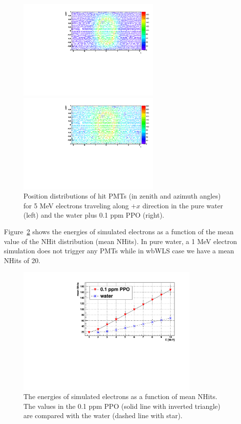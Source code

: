 \begin{figure}[htbp]
	\centering
	\begin{minipage}[t]{0.48\textwidth}
		\centering
		\includegraphics[width=7cm]{PMT_5MeVElectronWater.pdf}
	\end{minipage}
	\begin{minipage}[t]{0.48\textwidth}
		\centering
		\includegraphics[width=7cm]{PMT_5MeVElectron0p1ppmPPO.pdf}
	\end{minipage}
	\caption[Position distributions of hit PMTs (in zenith and azimuth angles).]{Position distributions of hit PMTs (in zenith and azimuth angles) for 5 MeV electrons traveling along $+x$ direction in the pure water (left) and the water plus 0.1 ppm PPO (right).}
	\label{pmt_wls}
\end{figure}

Figure~\ref{nhit_wls} shows the energies of simulated electrons as a function of the mean value of the $\mathrm{NHit}$ distribution (mean NHits). In pure water, a 1 MeV electron simulation does not trigger any PMTs while in wbWLS case we have a mean NHits of 20.

\begin{figure}[htbp]
	\centering	
	\includegraphics[width=9cm]{nhits_wls.pdf}
	\caption[The energies of simulated electrons as a function of mean NHits.]{The energies of simulated electrons as a function of mean NHits. The values in the 0.1 ppm PPO (solid line with inverted triangle) are compared with the water (dashed line with star).}
	\label{nhit_wls}
\end{figure}

